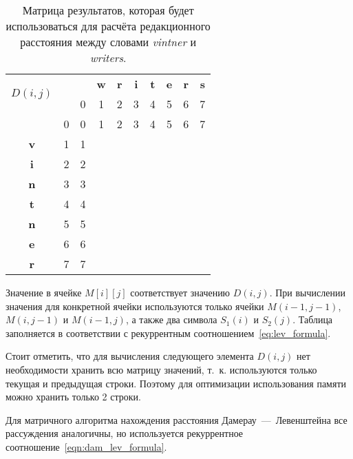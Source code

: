 \begin{table}[htb]
\caption{\centering Матрица результатов, которая будет использоваться для расчёта редакционного расстояния между словами \textit{vintner} и \textit{writers}.}
\small
\centering\begin{tabular}{|c|c|c|c|c|c|c|c|c|c|}
    \hline
    \multirow{2}{*}{$D(i,j)$} & \multirow{2}{*}{} & \multirow{1}{*}{} & \multirow{1}{*}{\textbf{w}} & \multirow{1}{*}{\textbf{r}} & \multirow{1}{*}{\textbf{i}} & \multirow{1}{*}{\textbf{t}} & \multirow{1}{*}{\textbf{e}} & \multirow{1}{*}{\textbf{r}} & \multirow{1}{*}{\textbf{s}} \\ \cline{3-10}
    & & 0 & 1 & 2 & 3 & 4 & 5 & 6 & 7 \\ \hline
    & 0 & 0 & 1 & 2 & 3 & 4 & 5 & 6 & 7 \\ \hline
    \textbf{v} & 1 & 1 & & & & & & & \\ \hline
    \textbf{i} & 2 & 2 & & & & & & & \\ \hline
    \textbf{n} & 3 & 3 & & & & & & & \\ \hline
    \textbf{t} & 4 & 4 & & & & & & & \\ \hline
    \textbf{n} & 5 & 5 & & & & & & & \\ \hline
    \textbf{e} & 6 & 6 & & & & & & & \\ \hline
    \textbf{r} & 7 & 7 & & & & & & & \\ \hline
\end{tabular}
\label{table:matrix}
\end{table}

Значение в ячейке \(M[i][j]\) соответствует значению \(D(i, j)\). При вычислении значения для конкретной ячейки используются только ячейки \(M(i - 1, j - 1)\), \(M(i, j - 1)\) и \(M(i - 1, j)\), а также два символа \(S_1(i)\) и \(S_2(j)\). Таблица заполняется в соответствии с рекуррентным соотношением~\ref{eq:lev_formula}.

Стоит отметить, что для вычисления следующего элемента \(D(i, j)\) нет необходимости хранить всю матрицу значений, т.~к. используются только текущая и предыдущая строки. Поэтому для оптимизации использования памяти можно хранить только 2 строки.

Для матричного алгоритма нахождения расстояния Дамерау~---~Левенштейна все рассуждения аналогичны, но используется рекуррентное соотношение~\ref{eqn:dam_lev_formula}.